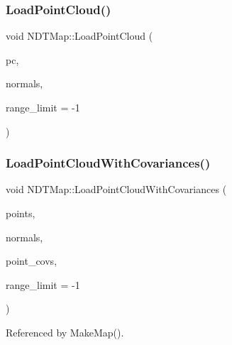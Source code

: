 \mbox{\label{classNDTMap_abb9af807d3928dc11bf734c961fc5662}} 
\subsubsection{\texorpdfstring{Load\+Point\+Cloud()}{LoadPointCloud()}\hspace{0.1cm}{\footnotesize\ttfamily [3/3]}}
{\footnotesize\ttfamily void N\+D\+T\+Map\+::\+Load\+Point\+Cloud (\begin{DoxyParamCaption}\item[{const \hyperlink{ndt__map_8h_ae39e6a39986574e0b1dd694a8a8c2a39}{P\+C\+XY} \&}]{pc,  }\item[{const \hyperlink{ndt__map_8h_ae39e6a39986574e0b1dd694a8a8c2a39}{P\+C\+XY} \&}]{normals,  }\item[{double}]{range\+\_\+limit = {\ttfamily -\/1} }\end{DoxyParamCaption})}

\mbox{\label{classNDTMap_a9d74f6496cf555cbe0c41139a59a0e44}} 
\subsubsection{\texorpdfstring{Load\+Point\+Cloud\+With\+Covariances()}{LoadPointCloudWithCovariances()}}
{\footnotesize\ttfamily void N\+D\+T\+Map\+::\+Load\+Point\+Cloud\+With\+Covariances (\begin{DoxyParamCaption}\item[{const Matrix\+Xd \&}]{points,  }\item[{const Matrix\+Xd \&}]{normals,  }\item[{const Matrix\+Xd \&}]{point\+\_\+covs,  }\item[{double}]{range\+\_\+limit = {\ttfamily -\/1} }\end{DoxyParamCaption})}



Referenced by Make\+Map().

\mbox{\label{classNDTMap_a5bc1d0a7b7949886670afb4f3c271a37}} 
